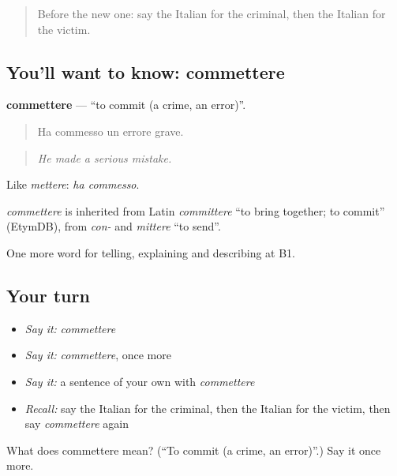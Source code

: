 \label{lesson:IT-C290-commettere}



\begin{quote}
Before the new one: say the Italian for the criminal, then the Italian for the victim.
\end{quote}

\subsection*{You'll want to know: commettere}
\textbf{commettere} — \textquotedblleft{}to commit (a crime, an error)\textquotedblright{}.

\begin{quote}
Ha commesso un errore grave.
\end{quote}

\begin{quote}
\emph{He made a serious mistake.}
\end{quote}

Like \emph{mettere}: \emph{ha commesso}.

\begin{cousinweb}
\emph{commettere} is inherited from Latin \emph{committere} \textquotedblleft{}to bring together; to commit\textquotedblright{} (EtymDB), from \emph{con-} and \emph{mittere} \textquotedblleft{}to send\textquotedblright{}.
\end{cousinweb}

\begin{grammarlens}[title={What you've built}]
One more word for telling, explaining and describing at B1.
\end{grammarlens}

\subsection*{Your turn}
\begin{itemize}
\raggedright
  \item \emph{Say it:} \emph{commettere}
  \item \emph{Say it:} \emph{commettere}, once more
  \item \emph{Say it:} a sentence of your own with \emph{commettere}
  \item \emph{Recall:} say the Italian for the criminal, then the Italian for the victim, then say \emph{commettere} again
\end{itemize}

\begin{tcolorbox}[breakable,colback=teal!4,colframe=teal!35!black,title={Before you move on}]
What does commettere mean? (\textquotedblleft{}To commit (a crime, an error)\textquotedblright{}.) Say it once more.
\end{tcolorbox}
